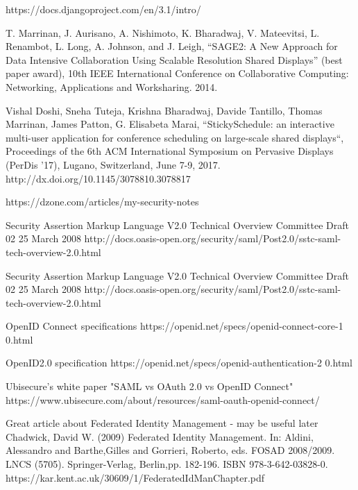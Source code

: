 \documentclass[magisterska,en]{pracamgr}
\begin{document}
\begin{thebibliography}{9}

  https://docs.djangoproject.com/en/3.1/intro/
  
  T. Marrinan, J. Aurisano, A. Nishimoto, K. Bharadwaj, V. Mateevitsi, L. Renambot, L. Long, A. Johnson, and J. Leigh, “SAGE2: A New Approach for Data Intensive Collaboration Using Scalable Resolution Shared Displays” (best paper award), 10th IEEE International Conference on Collaborative Computing: Networking, Applications and Worksharing. 2014.
  
  Vishal Doshi, Sneha Tuteja, Krishna Bharadwaj, Davide Tantillo, Thomas Marrinan, James Patton, G. Elisabeta Marai, “StickySchedule: an interactive multi-user application for conference scheduling on large-scale shared displays“, Proceedings of the 6th ACM International Symposium on Pervasive Displays (PerDis ’17), Lugano, Switzerland, June 7-9, 2017. http://dx.doi.org/10.1145/3078810.3078817
  
  
  https://dzone.com/articles/my-security-notes
  
 Security Assertion Markup Language V2.0 Technical Overview
 Committee Draft 02
 25 March 2008
 http://docs.oasis-open.org/security/saml/Post2.0/sstc-saml-tech-overview-2.0.html
 
 Security Assertion Markup Language V2.0 Technical Overview
 Committee Draft 02
 25 March 2008
 http://docs.oasis-open.org/security/saml/Post2.0/sstc-saml-tech-overview-2.0.html
 
 
 OpenID Connect specifications
 https://openid.net/specs/openid-connect-core-1 0.html
 
OpenID2.0 specification
https://openid.net/specs/openid-authentication-2 0.html
 
Ubisecure's white paper "SAML vs OAuth 2.0 vs OpenID Connect"
https://www.ubisecure.com/about/resources/saml-oauth-openid-connect/

Great article about Federated Identity Management - may be useful later
Chadwick, David W.  (2009) Federated Identity Management.    In: Aldini, Alessandro and Barthe,Gilles and Gorrieri, Roberto, eds. FOSAD 2008/2009.   LNCS  (5705).  Springer-Verlag, Berlin,pp. 182-196. ISBN 978-3-642-03828-0.
https://kar.kent.ac.uk/30609/1/FederatedIdManChapter.pdf
 

\end{thebibliography}
\end{document}
